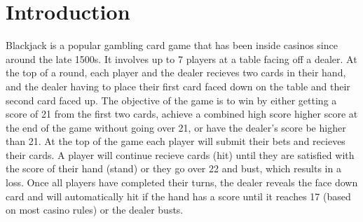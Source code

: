 \section{Introduction}
Blackjack is a popular gambling card game that has been inside casinos since around the late 1500s. It involves up to 7 players at a table facing off a dealer. At the top of a round, each player and the dealer recieves two cards in their hand, and the dealer having to place their first card faced down on the table and their second card faced up. The objective of the game is to win by either getting a score of 21 from the first two cards, achieve a combined high score higher score at the end of the game without going over 21, or have the dealer's score be higher than 21. At the top of the game each player will submit their bets and recieves their cards. A player will continue recieve cards (hit) until they are satisfied with the score of their hand (stand) or they go over 22 and bust, which results in a loss. Once all players have completed their turns, the dealer reveals the face down card and will automatically hit if the hand has a score until it reaches 17 (based on most casino rules) or the dealer busts.
\newline
